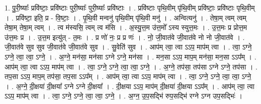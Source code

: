 \documentclass[17pt]{extarticle}
\begin{document}
1. पु॒री॒ष्याः᳚ प्रवि॑ष्टाः॒ प्रवि॑ष्टाः पुरी॒ष्याः᳚ पुरी॒ष्याः᳚ प्रवि॑ष्टाः । . प्रवि॑ष्टाः पृथि॒वीम् पृ॑थि॒वीम् प्रवि॑ष्टाः॒ प्रवि॑ष्टाः पृथि॒वीम् । . प्रवि॑ष्टा॒ इति॒ प्र - वि॒ष्टाः॒ । . पृ॒थि॒वी मन्वनु॑ पृथि॒वीम् पृ॑थि॒वी मनु॑ । . अन्वित्यनु॑ । . तेषा॒म् त्वम् त्वम् तेषा॒म् तेषा॒म् त्वम् । . त्व म॑स्यसि॒ त्वम् त्व म॑सि । . अ॒स्यु॒त्त॒म उ॑त्त॒मो᳚ ऽस्य स्युत्त॒मः । . उ॒त्त॒मः प्र प्रोत्त॒म उ॑त्त॒मः प्र । . उ॒त्त॒म इत्यु॑त् - त॒मः । . प्र णो॑ नः॒ प्र प्र णः॑ । . नो॒ जी॒वात॑वे जी॒वात॑वे नो नो जी॒वात॑वे । . जी॒वात॑वे सुव सुव जी॒वात॑वे जी॒वात॑वे सुव । . सु॒वेति॑ सुव । . आप॑म् त्वा॒ त्वा ऽऽप॒ माप॑म् त्वा । . त्वा॒ ऽग्ने॒ ऽग्ने॒ त्वा॒ त्वा॒ ऽग्ने॒ । . अ॒ग्ने॒ मन॑सा॒ मन॑सा ऽग्ने ऽग्ने॒ मन॑सा । . मन॒सा ऽऽप॒ माप॒म् मन॑सा॒ मन॒सा ऽऽप᳚म् । . आप॑म् त्वा॒ त्वा ऽऽप॒ माप॑म् त्वा । . त्वा॒ ऽग्ने॒ ऽग्ने॒ त्वा॒ त्वा॒ ऽग्ने॒ । . अ॒ग्ने॒ तप॑सा॒ तप॑सा ऽग्ने ऽग्ने॒ तप॑सा । . तप॒सा ऽऽप॒ माप॒म् तप॑सा॒ तप॒सा ऽऽप᳚म् । . आप॑म् त्वा॒ त्वा ऽऽप॒ माप॑म् त्वा । . त्वा॒ ऽग्ने॒ ऽग्ने॒ त्वा॒ त्वा॒ ऽग्ने॒ । . अ॒ग्ने॒ दी॒क्षया॑ दी॒क्षया᳚ ऽग्ने ऽग्ने दी॒क्षया᳚ । . दी॒क्षया ऽऽप॒ माप॑म् दी॒क्षया॑ दी॒क्षया ऽऽप᳚म् । . आप॑म् त्वा॒ त्वा ऽऽप॒ माप॑म् त्वा । . त्वा॒ ऽग्ने॒ ऽग्ने॒ त्वा॒ त्वा॒ ऽग्ने॒ । . अ॒ग्न॒ उ॒प॒सद्भि॑ रुप॒सद्भि॑ रग्ने ऽग्न उप॒सद्भिः॑ । \newline
\end{document}
